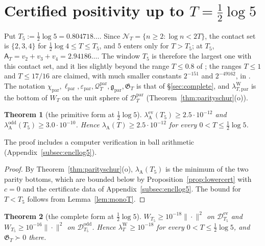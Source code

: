 \documentclass[11pt]{amsart}
\newtheorem{theorem}{Theorem}[section]
\theoremstyle{definition}
\theoremstyle{remark}
\newcommand{\lamW}{\lambda^{\mathrm W}_T}
\newcommand{\lamA}{\lambda_{\mathrm A}(T)}
\newcommand{\NT}{\mathcal N_T}
\newcommand{\Aconst}{\mathsf A_T}
\begin{document}
\section{Certified positivity up to \texorpdfstring{$T=\tfrac12\log5$}{T = (1/2) log 5}}\label{sec:log5}

Put $T_5:=\frac12\log5=0.804718\ldots$. Since $\NT=\{n\ge2:\log n<2T\}$, the contact set is
$\{2,3,4\}$ for $\frac12\log4\le T\le T_5$, and $5$ enters only for $T>T_5$; at $T_5$,
$\Aconst=v_2+v_3+v_4=2.94186\ldots$. The window $T_5$ is therefore the largest one with this contact set,
and it lies slightly beyond the range $T\le0.8$ of \cite[Thm.~1.2]{Zhu2026}; the ranges $T\le1$ and $T\le17/16$ are claimed, with much
smaller constants $2^{-151}$ and $2^{-49162}$, in \cite[Thms.~A, B]{Liu2026}. The notation
$\chi_{\mathrm{par}},\ell_{\mathrm{par}},\varepsilon_{\mathrm{par}},\mathcal Q^{\mathrm{par}}_T,
\mathfrak g_{\mathrm{par}},\mathfrak G_T$ is that of \S\ref{sec:complete}, and
$\lambda^{\mathrm W}_{T,\mathrm{par}}$ is the bottom of $W_T$ on the unit sphere of
$\mathcal D^{\mathrm{par}}_T$ (Theorem~\ref{thm:parityschur}(o)).

\begin{theorem}[the primitive form at $\frac12\log5$]\label{thm:log5A}
$\lambda^{\mathrm{ev}}_{\mathrm A}(T_5)\ge2.5\cdot10^{-12}$ and
$\lambda^{\mathrm{odd}}_{\mathrm A}(T_5)\ge3.0\cdot10^{-10}$. Hence
$\lamA\ge2.5\cdot10^{-12}$ for every $0<T\le\frac12\log5$.
\end{theorem}

\noindent The proof includes a computer verification in ball arithmetic (Appendix~\ref{subsec:encllog5}).

\begin{proof}
By Theorem~\ref{thm:parityschur}(o), $\lambda_{\mathrm A}(T_5)$ is the minimum of the two
parity bottoms, which are bounded below by Proposition~\ref{prop:lowercert} with $c=0$ and the
certificate data of Appendix~\ref{subsec:encllog5}. The bound for $T<T_5$ follows from
Lemma~\ref{lem:monoT}.
\end{proof}

\begin{theorem}[the complete form at $\frac12\log5$]\label{thm:log5W}
$W_{T_5}\ge10^{-18}\|\cdot\|^2$ on $\mathcal D^{\mathrm{ev}}_{T_5}$ and $W_{T_5}\ge10^{-16}\|\cdot\|^2$ on
$\mathcal D^{\mathrm{odd}}_{T_5}$. Hence $\lamW\ge10^{-18}$ for every $0<T\le\frac12\log5$, and
$\mathfrak G_T\succ0$ there.
\end{theorem}
\end{document}
